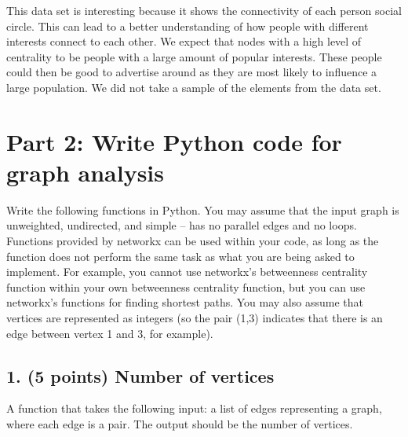 \documentclass[11pt]{article}
\begin{document}
    This data set is interesting because it shows the connectivity of each
person social circle. This can lead to a better understanding of how
people with different interests connect to each other. We expect that
nodes with a high level of centrality to be people with a large amount
of popular interests. These people could then be good to advertise
around as they are most likely to influence a large population. We did
not take a sample of the elements from the data set.

    \hypertarget{part-2-write-python-code-for-graph-analysis}{%
\section*{Part 2: Write Python code for graph
analysis}\label{part-2-write-python-code-for-graph-analysis}}

    Write the following functions in Python. You may assume that the input
graph is unweighted, undirected, and simple -- has no parallel edges and
no loops. Functions provided by networkx can be used within your code,
as long as the function does not perform the same task as what you are
being asked to implement. For example, you cannot use networkx's
betweenness centrality function within your own betweenness centrality
function, but you can use networkx's functions for finding shortest
paths. You may also assume that vertices are represented as integers (so
the pair (1,3) indicates that there is an edge between vertex 1 and 3,
for example).

    \hypertarget{points-number-of-vertices}{%
\subsection*{1. (5 points) Number of
vertices}\label{points-number-of-vertices}}

    A function that takes the following input: a list of edges representing
a graph, where each edge is a pair. The output should be the number of
vertices.
\end{document}

